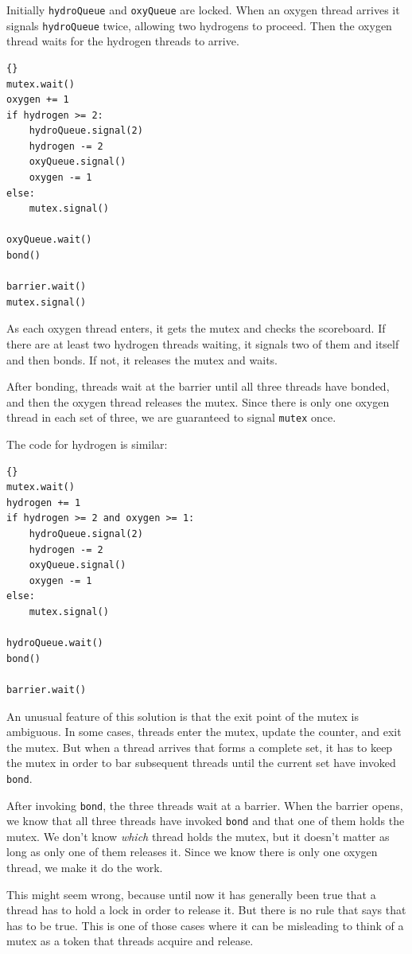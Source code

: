 \documentclass{book}
\begin{document}
Initially {\tt hydroQueue} and {\tt oxyQueue} are locked.  When
an oxygen thread arrives it signals {\tt hydroQueue} twice,
allowing two hydrogens to proceed.  Then the oxygen thread waits
for the hydrogen threads to arrive.

\begin{lstlisting}[caption={Oxygen code}]{}
mutex.wait()
oxygen += 1
if hydrogen >= 2:
    hydroQueue.signal(2)
    hydrogen -= 2
    oxyQueue.signal()
    oxygen -= 1
else:
    mutex.signal()

oxyQueue.wait()
bond()

barrier.wait()
mutex.signal()
\end{lstlisting}

As each oxygen thread enters, it gets the mutex and checks the scoreboard.
If there are at least two hydrogen threads waiting, it signals two of
them and itself and then bonds.  If not, it releases the mutex and
waits.

After bonding, threads wait at the barrier until all three threads
have bonded, and then the oxygen thread releases the mutex.  Since
there is only one oxygen thread in each set of three, we are guaranteed
to signal {\tt mutex} once.

The code for hydrogen is similar:

\begin{lstlisting}[caption={Hydrogen code}]{}
mutex.wait()
hydrogen += 1
if hydrogen >= 2 and oxygen >= 1:
    hydroQueue.signal(2)
    hydrogen -= 2
    oxyQueue.signal()
    oxygen -= 1
else:
    mutex.signal()

hydroQueue.wait()
bond()

barrier.wait()
\end{lstlisting}

An unusual feature of this solution is that
the exit point of the mutex is ambiguous.  In
some cases, threads enter the mutex, update the counter, and exit the
mutex.  But when a thread arrives that forms a complete set, it has to
keep the mutex in order to bar subsequent threads until the current
set have invoked {\tt bond}.

After invoking {\tt bond}, the three threads wait at a barrier.
When the barrier opens, we know that all three threads have invoked
{\tt bond} and that one of them holds the mutex.  We don't know
{\em which} thread holds the mutex, but it doesn't matter as long
as only one of them releases it.  Since we know there is only one
oxygen thread, we make it do the work.

This might seem wrong, because until now it
has generally been true that a thread has to hold a lock in
order to release it.  But there is no rule that says that has
to be true.  This is one of those cases where it can be misleading
to think of a mutex as a token that threads acquire and release.
\end{document}
